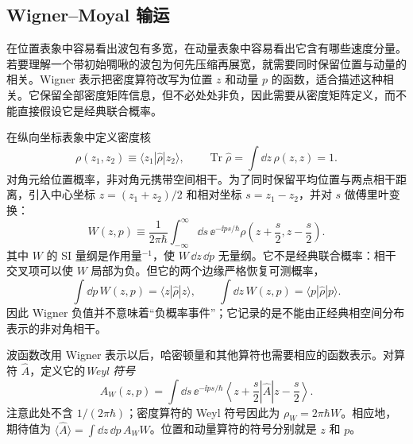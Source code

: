 


\subsection{Wigner--Moyal 输运}

在位置表象中容易看出波包有多宽，在动量表象中容易看出它含有哪些速度分量。若要理解一个带初始啁啾的波包为何先压缩再展宽，就需要同时保留位置与动量的相关。Wigner 表示把密度算符改写为位置 $z$ 和动量 $p$ 的函数，适合描述这种相关。它保留全部密度矩阵信息，但不必处处非负，因此需要从密度矩阵定义，而不能直接假设它是经典联合概率。

在纵向坐标表象中定义密度核
\[
\rho(z_1,z_2)\equiv\langle z_1|\hat\rho|z_2\rangle,
\qquad
\operatorname{Tr}\hat\rho=\int\dd z\,\rho(z,z)=1.
\]
对角元给位置概率，非对角元携带空间相干。为了同时保留平均位置与两点相干距离，引入中心坐标 $z=(z_1+z_2)/2$ 和相对坐标 $s=z_1-z_2$，并对 $s$ 做傅里叶变换：
\begin{equation}
{
W(z,p)
\equiv\frac{1}{2\pi\hbar}
\int_{-\infty}^{\infty}\dd s\,
\ee^{-\ii ps/\hbar}
\rho\!\left(z+\frac{s}{2},z-\frac{s}{2}\right).}
\label{eq:electron_wigner}
\end{equation}
其中 $W$ 的 SI 量纲是作用量$^{-1}$，使 $W\,\dd z\,\dd p$ 无量纲。它不是经典联合概率：相干交叉项可以使 $W$ 局部为负。但它的两个边缘严格恢复可测概率，
\begin{equation}
{
\int\dd p\,W(z,p)=\langle z|\hat\rho|z\rangle,
\qquad
\int\dd z\,W(z,p)=\langle p|\hat\rho|p\rangle.}
\label{eq:wigner_marginals}
\end{equation}
因此 Wigner 负值并不意味着“负概率事件”；它记录的是不能由正经典相空间分布表示的非对角相干。

波函数改用 Wigner 表示以后，哈密顿量和其他算符也需要相应的函数表示。对算符 $\hat A$，定义它的\emph{Weyl 符号}
\[
A_W(z,p)=\int\dd s\,\ee^{-\ii ps/\hbar}
\left\langle z+\frac{s}{2}\right|\hat A\left|z-\frac{s}{2}\right\rangle.
\]
注意此处不含 $1/(2\pi\hbar)$；密度算符的 Weyl 符号因此为 $\rho_W=2\pi\hbar W$。相应地，期待值为 $\langle\hat A\rangle=\int\dd z\,\dd p\,A_W W$。位置和动量算符的符号分别就是 $z$ 和 $p$。

